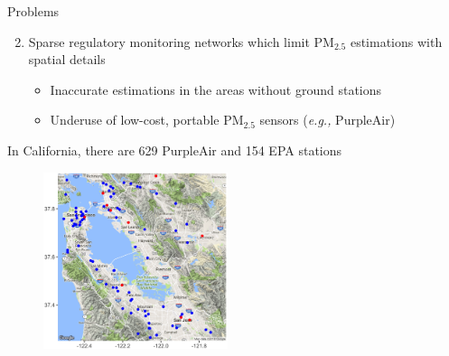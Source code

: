 \documentclass{beamer}
\begin{document}
\begin{frame}{Problems}
    \begin{enumerate}
        \setcounter{enumi}{1}
        \item<1-> Sparse regulatory monitoring networks which limit PM$_{2.5}$ estimations with spatial details
            \begin{itemize}
                \item<2-> \textcolor[rgb]{1,0.4,0}{Inaccurate estimations in the areas without ground stations}
                \item<3-> \textcolor[rgb]{1,0.4,0}{Underuse of low-cost, portable PM$_{2.5}$ sensors (\textit{e.g.,} PurpleAir)}
            \end{itemize}
    \end{enumerate}
    \vspace{-0.1cm}
    \textcolor[rgb]{0.1,0.1,0.6}{In California, there are 629 PurpleAir and 154 EPA stations}
    \begin{figure}
        \centering
        \includegraphics[width=0.48\textwidth]{img/bayarea.jpg}
    \end{figure}
\end{frame}
\end{document}
